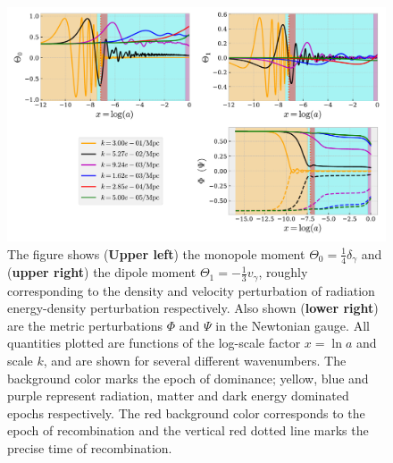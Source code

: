 \documentclass[twocolumn]{aastex62}
\begin{document}
\begin{figure}
    \includegraphics[scale = 0.65]{Figures/fig1.pdf}
    \caption{The figure shows (\textbf{Upper left}) the monopole moment $\Theta_0 = \frac{1}{4}\delta_\gamma$ and (\textbf{upper right}) the dipole moment $\Theta_1 = -\frac{1}{3}v_\gamma$, roughly corresponding to the density and velocity perturbation of radiation energy-density perturbation respectively. Also shown (\textbf{lower right}) are the metric perturbations $\Phi$ and $\Psi$ in the Newtonian gauge. All quantities plotted are functions of the log-scale factor $x = \ln a$ and scale $k$, and are shown for several different wavenumbers. The background color marks the epoch of dominance; yellow, blue and purple represent radiation, matter and dark energy dominated epochs respectively. The red background color corresponds to the epoch of recombination and the vertical red dotted line marks the precise time of recombination.} 
    \label{fig:fig1}
\end{figure}
\end{document}
